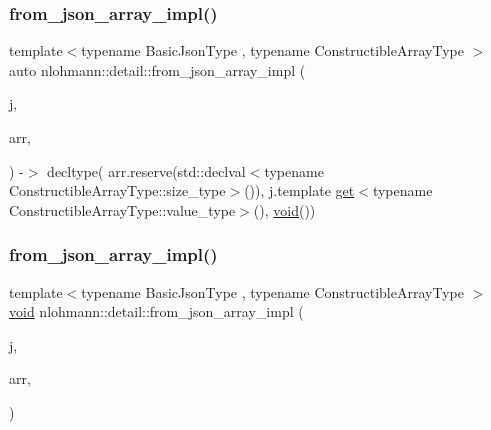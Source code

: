 \mbox{\label{namespacenlohmann_1_1detail_a464e1246f3df7edea79c3f81ab701edd}} 
\subsubsection{\texorpdfstring{from\+\_\+json\+\_\+array\+\_\+impl()}{from\_json\_array\_impl()}\hspace{0.1cm}{\footnotesize\ttfamily [3/4]}}
{\footnotesize\ttfamily template$<$typename Basic\+Json\+Type , typename Constructible\+Array\+Type $>$ \\
auto nlohmann\+::detail\+::from\+\_\+json\+\_\+array\+\_\+impl (\begin{DoxyParamCaption}\item[{const Basic\+Json\+Type \&}]{j,  }\item[{Constructible\+Array\+Type \&}]{arr,  }\item[{\hyperlink{structnlohmann_1_1detail_1_1priority__tag}{priority\+\_\+tag}$<$ 1 $>$}]{ }\end{DoxyParamCaption}) -\/$>$ decltype(
    arr.\+reserve(std\+::declval$<$typename Constructible\+Array\+Type\+::size\+\_\+type$>$()),
    j.\+template \hyperlink{namespacenlohmann_1_1detail_acc422c11342b31368f610b6f96fcedc6}{get}$<$typename Constructible\+Array\+Type\+::value\+\_\+type$>$(),
    \hyperlink{namespacenlohmann_1_1detail_a59fca69799f6b9e366710cb9043aa77d}{void}())
}

\mbox{\label{namespacenlohmann_1_1detail_a20cf21255e75cff1ffb0869c2c545e63}} 
\subsubsection{\texorpdfstring{from\+\_\+json\+\_\+array\+\_\+impl()}{from\_json\_array\_impl()}\hspace{0.1cm}{\footnotesize\ttfamily [4/4]}}
{\footnotesize\ttfamily template$<$typename Basic\+Json\+Type , typename Constructible\+Array\+Type $>$ \\
\hyperlink{namespacenlohmann_1_1detail_a59fca69799f6b9e366710cb9043aa77d}{void} nlohmann\+::detail\+::from\+\_\+json\+\_\+array\+\_\+impl (\begin{DoxyParamCaption}\item[{const Basic\+Json\+Type \&}]{j,  }\item[{Constructible\+Array\+Type \&}]{arr,  }\item[{\hyperlink{structnlohmann_1_1detail_1_1priority__tag}{priority\+\_\+tag}$<$ 0 $>$}]{ }\end{DoxyParamCaption})}

